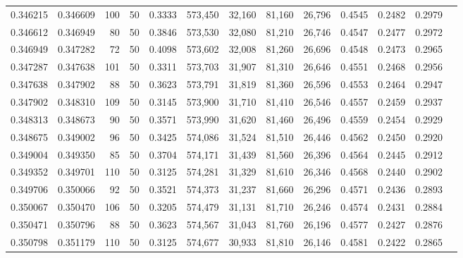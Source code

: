 \begin{tabular}{rrrrrrrrrrrrr}
0.346215 & 0.346609 &   100 &  50 &                                     0.3333 & 573,450 &  32,160 &  81,160 &  26,796 & 0.4545 & 0.2482 & 0.2979 \\
0.346612 & 0.346949 &    80 &  50 &                                     0.3846 & 573,530 &  32,080 &  81,210 &  26,746 & 0.4547 & 0.2477 & 0.2972 \\
0.346949 & 0.347282 &    72 &  50 &                                     0.4098 & 573,602 &  32,008 &  81,260 &  26,696 & 0.4548 & 0.2473 & 0.2965 \\
0.347287 & 0.347638 &   101 &  50 &                                     0.3311 & 573,703 &  31,907 &  81,310 &  26,646 & 0.4551 & 0.2468 & 0.2956 \\
0.347638 & 0.347902 &    88 &  50 &                                     0.3623 & 573,791 &  31,819 &  81,360 &  26,596 & 0.4553 & 0.2464 & 0.2947 \\
0.347902 & 0.348310 &   109 &  50 &                                     0.3145 & 573,900 &  31,710 &  81,410 &  26,546 & 0.4557 & 0.2459 & 0.2937 \\
0.348313 & 0.348673 &    90 &  50 &                                     0.3571 & 573,990 &  31,620 &  81,460 &  26,496 & 0.4559 & 0.2454 & 0.2929 \\
0.348675 & 0.349002 &    96 &  50 &                                     0.3425 & 574,086 &  31,524 &  81,510 &  26,446 & 0.4562 & 0.2450 & 0.2920 \\
0.349004 & 0.349350 &    85 &  50 &                                     0.3704 & 574,171 &  31,439 &  81,560 &  26,396 & 0.4564 & 0.2445 & 0.2912 \\
0.349352 & 0.349701 &   110 &  50 &                                     0.3125 & 574,281 &  31,329 &  81,610 &  26,346 & 0.4568 & 0.2440 & 0.2902 \\
0.349706 & 0.350066 &    92 &  50 &                                     0.3521 & 574,373 &  31,237 &  81,660 &  26,296 & 0.4571 & 0.2436 & 0.2893 \\
0.350067 & 0.350470 &   106 &  50 &                                     0.3205 & 574,479 &  31,131 &  81,710 &  26,246 & 0.4574 & 0.2431 & 0.2884 \\
0.350471 & 0.350796 &    88 &  50 &                                     0.3623 & 574,567 &  31,043 &  81,760 &  26,196 & 0.4577 & 0.2427 & 0.2876 \\
0.350798 & 0.351179 &   110 &  50 &                                     0.3125 & 574,677 &  30,933 &  81,810 &  26,146 & 0.4581 & 0.2422 & 0.2865 \\

\end{tabular}
